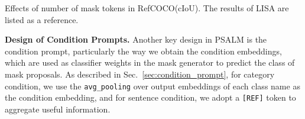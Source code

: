\begin{table}[h!]
  \begin{minipage}{.4\textwidth}

\centering

\captionsetup{font=small}
\footnotesize
\centering
\caption{Effects of number of mask tokens in RefCOCO(cIoU). The results of LISA are listed as a reference.}
  \end{minipage}\hfill
  \begin{minipage}{.55\textwidth}
\centering
\footnotesize
\caption{Ablation on different designs for condition prompts.
}
\label{tab:arch}

  \end{minipage}
\end{table}

\noindent\textbf{Design of Condition Prompts.}
Another key design in PSALM is the condition prompt, particularly the way we obtain the condition embeddings, which are used as classifier weights in the mask generator to predict the class of mask proposals. As described in Sec.~\ref{sec:condition_prompt}, for category condition, we use the \texttt{avg\_pooling} over output embeddings of each class name as the condition embedding, and for sentence condition, we adopt a \texttt{[REF]} token to aggregate useful information. 

